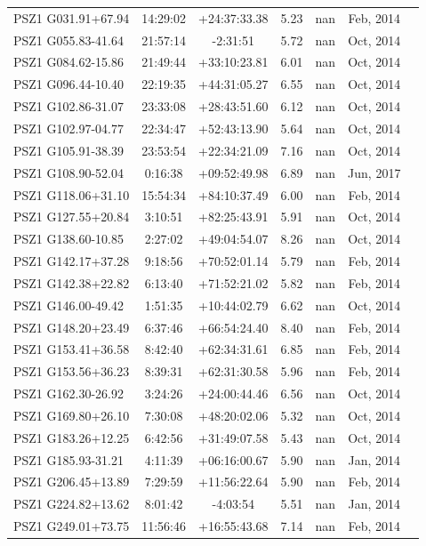\documentclass[apj, revtex4]{emulateapj}
\begin{document}
\begin{longtable*}{lcccccc}
PSZ1 G031.91+67.94 & 14:29:02 & +24:37:33.38 & 5.23 & nan & Feb, 2014\\
PSZ1 G055.83-41.64 & 21:57:14 & -2:31:51 & 5.72 & nan & Oct, 2014\\
PSZ1 G084.62-15.86 & 21:49:44 & +33:10:23.81 & 6.01 & nan & Oct, 2014\\
PSZ1 G096.44-10.40 & 22:19:35 & +44:31:05.27 & 6.55 & nan & Oct, 2014\\
PSZ1 G102.86-31.07 & 23:33:08 & +28:43:51.60 & 6.12 & nan & Oct, 2014\\
PSZ1 G102.97-04.77 & 22:34:47 & +52:43:13.90 & 5.64 & nan & Oct, 2014\\
PSZ1 G105.91-38.39 & 23:53:54 & +22:34:21.09 & 7.16 & nan & Oct, 2014\\
PSZ1 G108.90-52.04 & 0:16:38 & +09:52:49.98 & 6.89 & nan & Jun, 2017\\
PSZ1 G118.06+31.10 & 15:54:34 & +84:10:37.49 & 6.00 & nan & Feb, 2014\\
PSZ1 G127.55+20.84 & 3:10:51 & +82:25:43.91 & 5.91 & nan & Oct, 2014\\
PSZ1 G138.60-10.85 & 2:27:02 & +49:04:54.07 & 8.26 & nan & Oct, 2014\\
PSZ1 G142.17+37.28 & 9:18:56 & +70:52:01.14 & 5.79 & nan & Feb, 2014\\
PSZ1 G142.38+22.82 & 6:13:40 & +71:52:21.02 & 5.82 & nan & Feb, 2014\\
PSZ1 G146.00-49.42 & 1:51:35 & +10:44:02.79 & 6.62 & nan & Oct, 2014\\
PSZ1 G148.20+23.49 & 6:37:46 & +66:54:24.40 & 8.40 & nan & Feb, 2014\\
PSZ1 G153.41+36.58 & 8:42:40 & +62:34:31.61 & 6.85 & nan & Feb, 2014\\
PSZ1 G153.56+36.23 & 8:39:31 & +62:31:30.58 & 5.96 & nan & Feb, 2014\\
PSZ1 G162.30-26.92 & 3:24:26 & +24:00:44.46 & 6.56 & nan & Oct, 2014\\
PSZ1 G169.80+26.10 & 7:30:08 & +48:20:02.06 & 5.32 & nan & Oct, 2014\\
PSZ1 G183.26+12.25 & 6:42:56 & +31:49:07.58 & 5.43 & nan & Oct, 2014\\
PSZ1 G185.93-31.21 & 4:11:39 & +06:16:00.67 & 5.90 & nan & Jan, 2014\\
PSZ1 G206.45+13.89 & 7:29:59 & +11:56:22.64 & 5.90 & nan & Feb, 2014\\
PSZ1 G224.82+13.62 & 8:01:42 & -4:03:54 & 5.51 & nan & Jan, 2014\\
PSZ1 G249.01+73.75 & 11:56:46 & +16:55:43.68 & 7.14 & nan & Feb, 2014\\

\end{longtable*}
\end{document}
